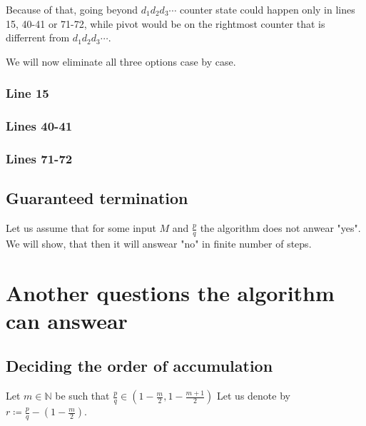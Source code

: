 Because of that, going beyond $d_1d_2d_3\cdots$ counter state 
could happen only in lines 15, 40-41 or 71-72, while pivot would be 
on the rightmost counter that is differrent from $d_1d_2d_3\cdots$. 

We will now eliminate all three options case by case. 
\subsubsection{Line 15}
\subsubsection{Lines 40-41}
\subsubsection{Lines 71-72}

\subsection{Guaranteed termination}
Let us assume that for some input $M$ and $\frac{p}{q}$ the algorithm does not anwear "yes". 
We will show, that then it will answear "no" in finite number of steps.

\section{Another questions the algorithm can answear}
\subsection{Deciding the order of accumulation}
Let $m \in \mathbb{N}$ be such that $\frac{p}{q} \in (1-\frac{m}{2},1-
\frac{m+1}{2})$
Let us denote by $r \coloneqq \frac{p}{q} - (1-\frac{m}{2})$. \\ 

